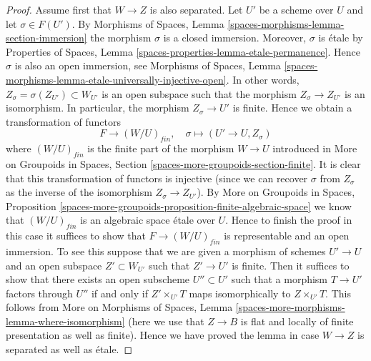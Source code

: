 \documentclass{stacks-project}
\theoremstyle{plain}
\theoremstyle{definition}
\theoremstyle{remark}
\numberwithin{equation}{subsection}
\begin{document}
\begin{proof}
Assume first that $W \to Z$ is also separated.
Let $U'$ be a scheme over $U$ and let $\sigma \in F(U')$. By
Morphisms of Spaces, Lemma \ref{spaces-morphisms-lemma-section-immersion}
the morphism $\sigma$ is a closed immersion.
Moreover, $\sigma$ is \'etale by
Properties of Spaces, Lemma \ref{spaces-properties-lemma-etale-permanence}.
Hence $\sigma$ is also an open immersion, see
Morphisms of Spaces,
Lemma \ref{spaces-morphisms-lemma-etale-universally-injective-open}.
In other words, $Z_\sigma = \sigma(Z_{U'}) \subset W_{U'}$ is
an open subspace such that the morphism $Z_\sigma \to Z_{U'}$
is an isomorphism. In particular, the morphism $Z_\sigma \to U'$
is finite. Hence we obtain a transformation of functors
$$
F \longrightarrow (W/U)_{fin}, \quad
\sigma \longmapsto (U' \to U, Z_\sigma)
$$
where $(W/U)_{fin}$ is the finite part of the morphism $W \to U$
introduced in
More on Groupoids in Spaces, Section
\ref{spaces-more-groupoids-section-finite}.
It is clear that this transformation of functors is injective (since we can
recover $\sigma$ from $Z_\sigma$ as the inverse of the isomorphism
$Z_\sigma \to Z_{U'}$). By
More on Groupoids in Spaces, Proposition
\ref{spaces-more-groupoids-proposition-finite-algebraic-space}
we know that $(W/U)_{fin}$ is an algebraic space \'etale over $U$.
Hence to finish the proof in this case it suffices to show that
$F \to (W/U)_{fin}$ is representable and an open immersion.
To see this suppose that we are given a morphism of schemes $U' \to U$
and an open subspace $Z' \subset W_{U'}$ such that $Z' \to U'$
is finite. Then it suffices to show that there exists an
open subscheme $U'' \subset U'$ such that a morphism
$T \to U'$ factors through $U''$ if and only if $Z' \times_{U'} T$
maps isomorphically to $Z \times_{U'} T$. This follows from
More on Morphisms of Spaces, Lemma
\ref{spaces-more-morphisms-lemma-where-isomorphism}
(here we use that $Z \to B$ is flat and locally of finite presentation
as well as finite).
Hence we have proved the lemma in case $W \to Z$ is separated
as well as \'etale.


\end{proof}
\end{document}
